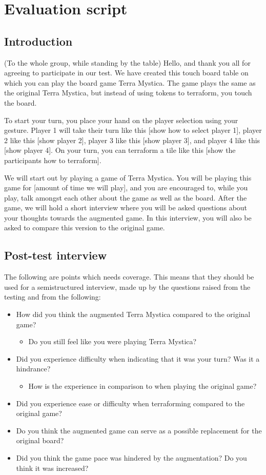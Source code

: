 \chapter{Evaluation script}\label{ch:TestScript}
\section{Introduction}
(To the whole group, while standing by the table)
Hello, and thank you all for agreeing to participate in our test. We have created this touch board table on which you can play the board game Terra Mystica. The game plays the same as the original Terra Mystica, but instead of using tokens to terraform, you touch the board.

To start your turn, you place your hand on the player selection using your gesture. Player 1 will take their turn like this [show how to select player 1], player 2 like this [show player 2], player 3 like this [show player 3], and player 4 like this [show player 4]. On your turn, you can terraform a tile like this [show the participants how to terraform].

We will start out by playing a game of Terra Mystica. You will be playing this game for [amount of time we will play], and you are encouraged to, while you play, talk amongst each other about the game as well as the board. After the game, we will hold a short interview where you will be asked questions about your thoughts towards the augmented game. In this interview, you will also be asked to compare this version to the original game.

\section{Post-test interview}
The following are points which needs coverage. This means that they should be used for a semistructured interview, made up by the questions raised from the testing and from the following:
\begin{itemize}
\item How did you think the augmented Terra Mystica compared to the original game?
\begin{itemize}
\item Do you still feel like you were playing Terra Mystica?
\end{itemize}
\item Did you experience difficulty when indicating that it was your turn? Was it a hindrance?
\begin{itemize}
\item How is the experience in comparison to when playing the original game?
\end{itemize}
\item Did you experience ease or difficulty when terraforming compared to the original game?
\item Do you think the augmented game can serve as a possible replacement for the original board?
\item Did you think the game pace was hindered by the augmentation? Do you think it was increased?
\end{itemize}
